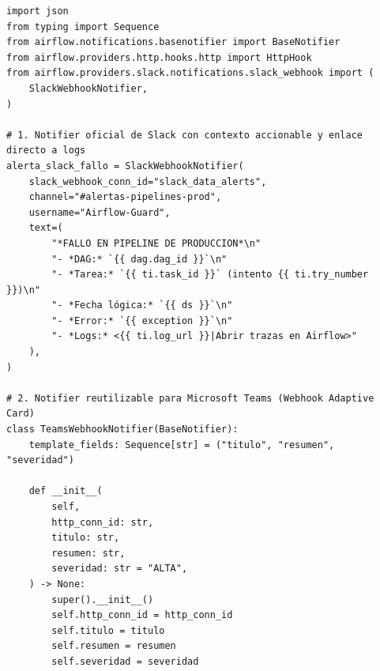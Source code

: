 \begin{lstlisting}[style=python, caption={Configuración de \texttt{SlackWebhookNotifier} y desarrollo de un \texttt{BaseNotifier} propio para Microsoft Teams.}, label={lst:notifiers-produccion}]
import json
from typing import Sequence
from airflow.notifications.basenotifier import BaseNotifier
from airflow.providers.http.hooks.http import HttpHook
from airflow.providers.slack.notifications.slack_webhook import (
    SlackWebhookNotifier,
)

# 1. Notifier oficial de Slack con contexto accionable y enlace directo a logs
alerta_slack_fallo = SlackWebhookNotifier(
    slack_webhook_conn_id="slack_data_alerts",
    channel="#alertas-pipelines-prod",
    username="Airflow-Guard",
    text=(
        "*FALLO EN PIPELINE DE PRODUCCION*\n"
        "- *DAG:* `{{ dag.dag_id }}`\n"
        "- *Tarea:* `{{ ti.task_id }}` (intento {{ ti.try_number }})\n"
        "- *Fecha lógica:* `{{ ds }}`\n"
        "- *Error:* `{{ exception }}`\n"
        "- *Logs:* <{{ ti.log_url }}|Abrir trazas en Airflow>"
    ),
)

# 2. Notifier reutilizable para Microsoft Teams (Webhook Adaptive Card)
class TeamsWebhookNotifier(BaseNotifier):
    template_fields: Sequence[str] = ("titulo", "resumen", "severidad")

    def __init__(
        self,
        http_conn_id: str,
        titulo: str,
        resumen: str,
        severidad: str = "ALTA",
    ) -> None:
        super().__init__()
        self.http_conn_id = http_conn_id
        self.titulo = titulo
        self.resumen = resumen
        self.severidad = severidad


\end{lstlisting}

